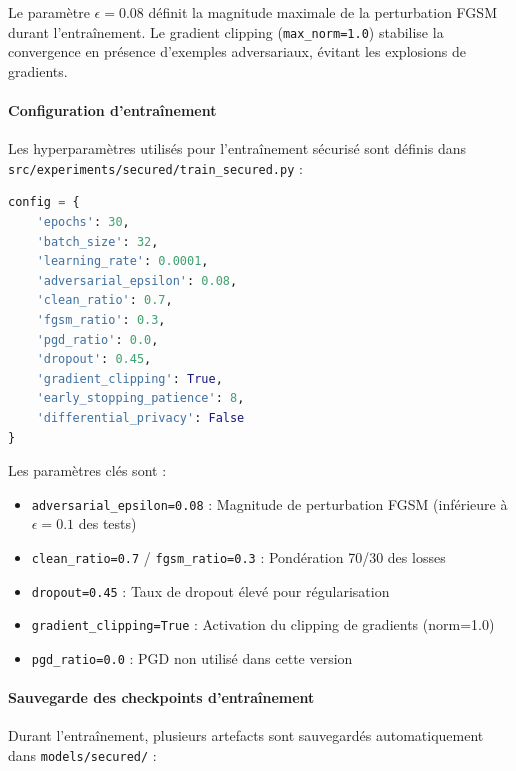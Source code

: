 Le paramètre $\epsilon = 0.08$ définit la magnitude maximale de la perturbation FGSM durant l'entraînement.
Le gradient clipping (\texttt{max\_norm=1.0}) stabilise la convergence en présence d'exemples adversariaux, évitant les explosions de gradients.

\paragraph{Configuration d'entraînement}

Les hyperparamètres utilisés pour l'entraînement sécurisé sont définis dans \texttt{src/experiments/secured/train\_secured.py} :

\begin{lstlisting}[language=Python, caption=Configuration d'entraînement sécurisé]
config = {
    'epochs': 30,
    'batch_size': 32,
    'learning_rate': 0.0001,
    'adversarial_epsilon': 0.08,
    'clean_ratio': 0.7,
    'fgsm_ratio': 0.3,
    'pgd_ratio': 0.0,
    'dropout': 0.45,
    'gradient_clipping': True,
    'early_stopping_patience': 8,
    'differential_privacy': False
}
\end{lstlisting}

Les paramètres clés sont :
\begin{itemize}
    \item \texttt{adversarial\_epsilon=0.08} : Magnitude de perturbation FGSM (inférieure à $\epsilon = 0.1$ des tests)
    \item \texttt{clean\_ratio=0.7} / \texttt{fgsm\_ratio=0.3} : Pondération 70/30 des losses
    \item \texttt{dropout=0.45} : Taux de dropout élevé pour régularisation
    \item \texttt{gradient\_clipping=True} : Activation du clipping de gradients (norm=1.0)
    \item \texttt{pgd\_ratio=0.0} : PGD non utilisé dans cette version
\end{itemize}

\paragraph{Sauvegarde des checkpoints d'entraînement}

Durant l'entraînement, plusieurs artefacts sont sauvegardés automatiquement dans \texttt{models/secured/} :


